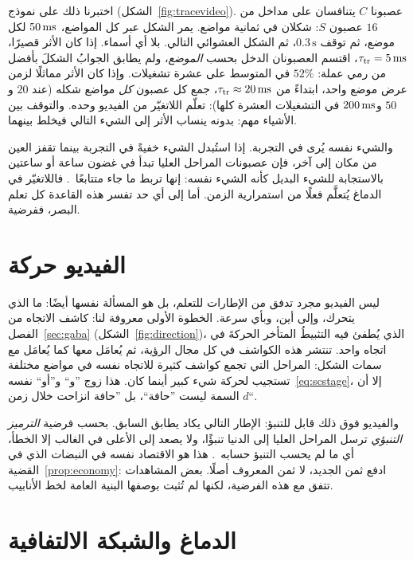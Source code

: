 اختبرنا ذلك على نموذج (الشكل~\ref{fig:tracevideo}). عصبونا $C$ يتنافسان على مداخل من $16$ عصبون $S$: شكلان في ثمانية مواضع. يمر الشكل عبر كل المواضع، $50\,\text{ms}$ لكل موضع، ثم توقف $0.3\,\text{s}$، ثم الشكل العشوائي التالي. بلا أي أسماء. إذا كان الأثر قصيرًا، $\tau_{\text{tr}}=5\,\text{ms}$، اقتسم العصبونان الدخل بحسب \emph{الموضع}، ولم يطابق الجوابُ الشكلَ بأفضل من رمي عملة: $52\%$ في المتوسط على عشرة تشغيلات. وإذا كان الأثر مماثلًا لزمن عرض موضع واحد، ابتداءً من $\tau_{\text{tr}}\approx20\,\text{ms}$، جمع كل عصبون \emph{كل} مواضع شكله (عند $20$ و$50$ و$200\,\text{ms}$ في التشغيلات العشرة كلها): تعلّم اللاتغيّر من الفيديو وحده. والتوقف بين الأشياء مهم: بدونه ينساب الأثر إلى الشيء التالي فيخلط بينهما.

والشيء نفسه يُرى في التجربة. إذا استُبدل الشيء خفيةً في التجربة بينما تقفز العين من مكان إلى آخر، فإن عصبونات المراحل العليا تبدأ في غضون ساعة أو ساعتين بالاستجابة للشيء البديل كأنه الشيء نفسه: إنها تربط ما جاء متتابعًا~\cite{LiDiCarlo2008}. فاللاتغيّر في الدماغ يُتعلَّم فعلًا من استمرارية الزمن. أما إلى أي حد تفسر هذه القاعدة كل تعلم البصر، ففرضية.

\section{الفيديو حركة}

ليس الفيديو مجرد تدفق من الإطارات للتعلم، بل هو المسألة نفسها أيضًا: ما الذي يتحرك، وإلى أين، وبأي سرعة. الخطوة الأولى معروفة لنا: كاشف الاتجاه من الفصل~\ref{sec:gaba} (الشكل~\ref{fig:direction})، الذي يُطفئ فيه التثبيطُ المتأخر الحركةَ في اتجاه واحد. تنتشر هذه الكواشف في كل مجال الرؤية، ثم يُعامَل معها كما يُعامَل مع سمات الشكل: المراحل التي تجمع كواشف كثيرة للاتجاه نفسه في مواضع مختلفة تستجيب لحركة شيء كبير أينما كان. هذا زوج ”و“ و”أو“ نفسه~\eqref{eq:scstage}، إلا أن السمة ليست ”حافة“، بل ”حافة انزاحت خلال زمن $d$“.

والفيديو فوق ذلك قابل للتنبؤ: الإطار التالي يكاد يطابق السابق. بحسب فرضية \emph{الترميز التنبؤي} ترسل المراحل العليا إلى الدنيا تنبؤًا، ولا يصعد إلى الأعلى في الغالب إلا الخطأ، أي ما لم يحسب التنبؤ حسابه~\cite{RaoBallard1999}. هذا هو الاقتصاد نفسه في النبضات الذي في القضية~\ref{prop:economy}: ادفع ثمن الجديد، لا ثمن المعروف أصلًا. بعض المشاهدات تتفق مع هذه الفرضية، لكنها لم تُثبت بوصفها البنية العامة لخط الأنابيب.

\section{الدماغ والشبكة الالتفافية}


